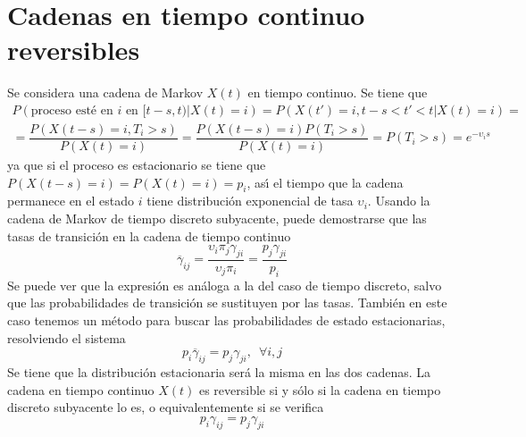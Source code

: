 \section{Cadenas en tiempo continuo reversibles}
Se considera una cadena de Markov $X(t)$ en tiempo continuo. Se
tiene que
\[
\begin{array}{l}
P(\text{proceso est\'{e} en $i$ en $[t-s,t)$}|X(t)=i)=
P(X(t')=i, t-s<t'<t|X(t)=i)=\\[10pt]
=\dfrac{P(X(t-s)=i,T_i>s)}{P(X(t)=i)}
=\dfrac{P(X(t-s)=i)P(T_i>s)}{P(X(t)=i)}= P(T_i>s)=e^{-\upsilon_i
s}
\end{array}
\]
ya que si el proceso es estacionario se tiene que $P(X(t-s)=i)=P(
X(t)=i)=p_i$, as\'{\i} el tiempo que la cadena permanece en el estado
$i$ tiene distribuci\'{o}n exponencial de tasa $\upsilon_i$. Usando la
cadena de Markov de tiempo discreto subyacente, puede demostrarse
que las tasas de transici\'{o}n en la cadena de tiempo continuo
\[
\overline \gamma_{ij}=\dfrac{\upsilon_i \pi_j
\gamma_{ji}}{\upsilon_j \pi_i}=\dfrac{p_j \gamma_{ji}}{p_i}
\]
Se puede ver que la expresi\'{o}n es an\'{a}loga a la del caso de tiempo
discreto, salvo que las probabilidades de transici\'{o}n se
sustituyen por las tasas. Tambi\'{e}n en este caso tenemos un m\'{e}todo
para buscar las probabilidades de estado estacionarias,
resolviendo el sistema
\[
p_i \overline \gamma_{ij}=p_j \gamma_{ji},\enspace \forall i,j
\]
Se tiene que la distribuci\'{o}n estacionaria ser\'{a} la misma en las
dos cadenas. La cadena en tiempo continuo $X(t)$ es reversible si
y s\'{o}lo si la cadena en tiempo discreto subyacente lo es, o
equivalentemente si se verifica
\[
p_i\gamma_{ij}=p_j\gamma_{ji}
\]
